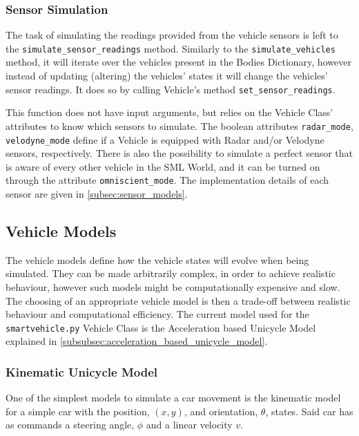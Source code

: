 \subsubsection{Sensor Simulation}

The task of simulating the readings provided from the vehicle sensors is left to the \texttt{simulate\_sensor\_readings} method. Similarly to the \texttt{simulate\_vehicles} method, it will iterate over the vehicles present in the Bodies Dictionary, however instead of updating (altering) the vehicles' states it will change the vehicles' sensor readings. It does so by calling Vehicle's method \texttt{set\_sensor\_readings}.

This function does not have input arguments, but relies on the Vehicle Class' attributes to know which sensors to simulate. The boolean attributes \texttt{radar\_mode}, \texttt{velodyne\_mode} define if a Vehicle is equipped with Radar and/or Velodyne sensors, respectively. There is also the possibility to simulate a perfect sensor that is aware of every other vehicle in the SML World, and it can be turned on through the attribute \texttt{omniscient\_mode}. The implementation details of each sensor are given in \ref{subsec:sensor_models}.

\subsection{Vehicle Models}
\label{subsec:vehicle_models}

The vehicle models define how the vehicle states will evolve when being simulated. They can be made arbitrarily complex, in order to achieve realistic behaviour, however such models might be computationally expensive and slow. The choosing of an appropriate vehicle model is then a trade-off between realistic behaviour and computational efficiency. The current model used for the \texttt{smartvehicle.py} Vehicle Class is the Acceleration based Unicycle Model explained in \ref{subsubsec:acceleration_based_unicycle_model}.

\subsubsection{Kinematic Unicycle Model}
\label{subsubsec:kinematic_unicycle_model}

One of the simplest models to simulate a car movement is the kinematic model for a simple car with the position, $(x,y)$, and orientation, $\theta$, states. Said car has as commands a steering angle, $\phi$ and a linear velocity $v$.

